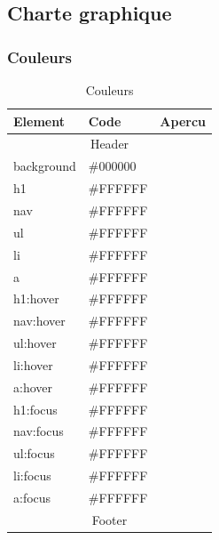 \documentclass[letter, 11pt]{report}
\begin{document}
\subsection{Charte graphique}

\subsubsection{Couleurs}

\begin{table}[h]
	\caption{Couleurs}
	\begin{center}
		\begin{tabular}{|l|l|l|}
		\hline
		Element    					& Code     & Apercu \\ \hline
		\multicolumn{3}{|c|}{Header} \\ \hline
		background 					& \#000000 & \cellcolor[HTML]{000000} \\ \hline
		h1         					& \#FFFFFF & \cellcolor[HTML]{FFFFFF} \\ \hline
		nav        					& \#FFFFFF & \cellcolor[HTML]{FFFFFF} \\ \hline
		ul         					& \#FFFFFF & \cellcolor[HTML]{FFFFFF} \\ \hline
		li         					& \#FFFFFF & \cellcolor[HTML]{FFFFFF} \\ \hline
		a          					& \#FFFFFF & \cellcolor[HTML]{FFFFFF} \\ \hline
		h1:hover   					& \#FFFFFF & \cellcolor[HTML]{FFFFFF} \\ \hline
		nav:hover  					& \#FFFFFF & \cellcolor[HTML]{FFFFFF} \\ \hline
		ul:hover   					& \#FFFFFF & \cellcolor[HTML]{FFFFFF} \\ \hline
		li:hover   					& \#FFFFFF & \cellcolor[HTML]{FFFFFF} \\ \hline
		a:hover    					& \#FFFFFF & \cellcolor[HTML]{FFFFFF} \\ \hline
		h1:focus   					& \#FFFFFF & \cellcolor[HTML]{FFFFFF} \\ \hline
		nav:focus  					& \#FFFFFF & \cellcolor[HTML]{FFFFFF} \\ \hline
		ul:focus   					& \#FFFFFF & \cellcolor[HTML]{FFFFFF} \\ \hline
		li:focus   					& \#FFFFFF & \cellcolor[HTML]{FFFFFF} \\ \hline
		a:focus    					& \#FFFFFF & \cellcolor[HTML]{FFFFFF} \\ \hline
		\multicolumn{3}{|c|}{Footer} \\ \hline

\end{tabular}
\end{center}
\end{table}
\end{document}
